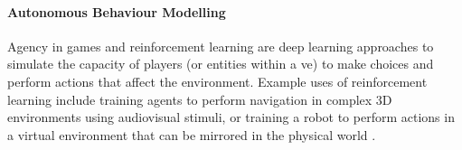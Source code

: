 \paragraph{Autonomous Behaviour Modelling}
Agency in games and reinforcement learning are deep learning approaches to simulate the capacity of players (or entities within a \acrshort{ve}) to make choices and perform actions that affect the environment. Example uses of reinforcement learning include training agents to perform navigation in complex 3D environments using audiovisual stimuli, or training a robot to perform actions in a virtual environment that can be mirrored in the physical world \citep{yannakakis2018artificial, matulis2021robot}.



